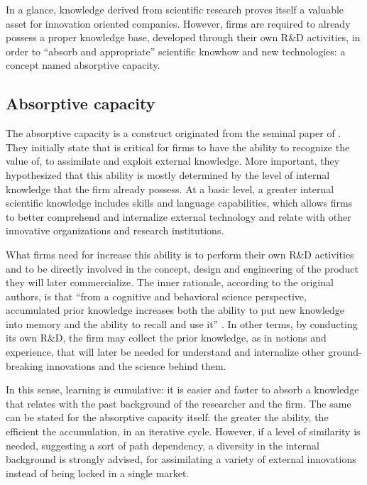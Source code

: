 In a glance, knowledge derived from scientific research proves itself a valuable asset for innovation oriented companies. However, firms are required to already possess a proper knowledge base, developed through their own R\&D activities, in order to \enquote{absorb and appropriate} scientific knowhow and new technologies: a concept named absorptive capacity.

\subsection{Absorptive capacity}

The absorptive capacity is a construct originated from the seminal paper of \citet{Cohen1990}. They initially state that is critical for firms to have the ability to recognize the value of, to assimilate and exploit external knowledge. More important, they hypothesized that this ability is mostly determined by the level of internal knowledge that the firm already possess. At a basic level, a greater internal scientific knowledge includes skills and language capabilities, which allows firms to better comprehend and internalize external technology and relate with other innovative organizations and research institutions.

What firms need for increase this ability is to perform their own R\&D activities and to be directly involved in the concept, design and engineering of the product they will later commercialize. The inner rationale, according to the original authors, is that \enquote{from a cognitive and behavioral science perspective, accumulated prior knowledge increases both the ability to put new knowledge into memory and the ability to recall and use it} \citep{Cohen1990}. In other terms, by conducting its own R\&D, the firm may collect the prior knowledge, as in notions and experience, that will later be needed for understand and internalize other ground-breaking innovations and the science behind them. 

In this sense, learning is cumulative: it is easier and faster to absorb a knowledge that relates with the past background of the researcher and the firm. The same can be stated for the absorptive capacity itself: the greater the ability, the efficient the accumulation, in an iterative cycle. However, if a level of similarity is needed, suggesting a sort of path dependency, a diversity in the internal background is strongly advised, for assimilating a variety of external innovations instead of being locked in a single market. 

